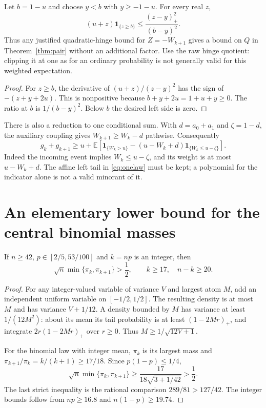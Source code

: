 \documentclass[11pt,a4paper]{article}
\newcommand{\E}{\mathbb E}\newcommand{\Pp}{\mathbb P}
\begin{document}
\begin{lemma}\label{lem:hinge}
Let $b=1-u$ and choose $y<b$ with $y\ge-1-u$. For every real $z$,
\[
 (u+z)\mathbf1_{\{z\ge b\}}
       \le\frac{(z-y)_+^2}{(b-y)^2}.
\]
Thus any justified quadratic-hinge bound for $Z=-W_{k+1}$ gives a bound
on $Q$ in Theorem~\ref{thm:pair} without an additional factor.
Use the raw hinge quotient: clipping it at one as for an ordinary probability
is not generally valid for this weighted expectation.
\end{lemma}
\begin{proof}
For $z\ge b$, the derivative of $(u+z)/(z-y)^2$ has the sign of
$-(z+y+2u)$. This is nonpositive because $b+y+2u=1+u+y\ge0$.
The ratio at $b$ is $1/(b-y)^2$. Below $b$ the desired left side is zero.
\end{proof}

There is also a reduction to one conditional sum. With $d=a_0+a_1$ and
$\zeta=1-d$, the auxiliary coupling gives $W_{k+1}\ge W_k-d$ pathwise.
Consequently
\begin{equation}\label{eq:onelaw}
 g_k+g_{k+1}\ge u+\E\left[
 \mathbf1_{\{W_k>u\}}-(u-W_k+d)\mathbf1_{\{W_k\le u-\zeta\}}\right].
\end{equation}
Indeed the incoming event implies $W_k\le u-\zeta$, and its weight is
at most $u-W_k+d$. The affine left tail in \eqref{eq:onelaw} must be kept;
a polynomial for the indicator alone is not a valid minorant of it.

\section{An elementary lower bound for the central binomial masses}
\begin{lemma}\label{lem:mass}
If $n\ge42$, $p\in[2/5,53/100]$ and $k=np$ is an integer, then
\[
 \sqrt n\min\{\pi_k,\pi_{k+1}\}>\frac12,
 \qquad k\ge17,\quad n-k\ge20.
\]
\end{lemma}
\begin{proof}
For any integer-valued variable of variance $V$ and largest atom $M$,
add an independent uniform variable on $[-1/2,1/2]$. The resulting density
is at most $M$ and has variance $V+1/12$. A density bounded by $M$ has
variance at least $1/(12M^2)$: about its mean its tail probability is at
least $(1-2Mr)_+$, and integrate $2r(1-2Mr)_+$ over $r\ge0$.
Thus $M\ge1/\sqrt{12V+1}$.

For the binomial law with integer mean, $\pi_k$ is its largest mass and
$\pi_{k+1}/\pi_k=k/(k+1)\ge17/18$. Since $p(1-p)\le1/4$,
\[
 \sqrt n\min\{\pi_k,\pi_{k+1}\}
 \ge\frac{17}{18\sqrt{3+1/42}}>\frac12.
\]
The last strict inequality is the rational comparison
$289/81>127/42$. The integer bounds follow from $np\ge16.8$
and $n(1-p)\ge19.74$.
\end{proof}
\end{document}
